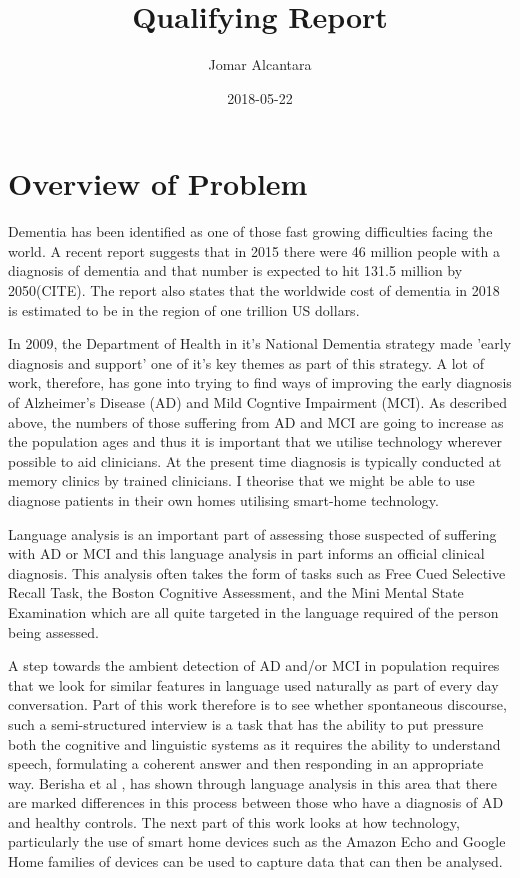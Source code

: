 \documentclass{article}
\title{Qualifying Report}
\date{2018-05-22}
\author{Jomar Alcantara}
\begin{document}
	\maketitle
	\newpage
	\section{Overview of Problem}
	Dementia has been identified as one of those fast growing difficulties facing the world. A recent report suggests that in 2015 there were 46 million people with a diagnosis of dementia and that number is expected to hit 131.5 million by 2050(CITE). The report also states that the worldwide cost of dementia in 2018 is estimated to be in the region of one trillion US dollars.
	\newline
	\par
	In 2009, the Department of Health in it's National Dementia strategy made 'early diagnosis and support' one of it's key themes as part of this strategy. A lot of work, therefore, has gone into trying to find ways of improving the early diagnosis of Alzheimer's Disease (AD) and Mild Cogntive Impairment (MCI). As described above, the numbers of those suffering from AD and MCI are going to increase as the population ages and thus it is important that we utilise technology wherever possible to aid clinicians. At the present time diagnosis is typically conducted at memory clinics by trained clinicians. I theorise that we might be able to use diagnose patients in their own homes utilising smart-home technology. 
	\newline
	\par
	Language analysis is an important part of assessing those suspected of suffering with AD or MCI and this language analysis in part informs an official clinical diagnosis. This analysis often takes the form of tasks such as Free Cued Selective Recall Task, the Boston Cognitive Assessment, and the Mini Mental State Examination which are all quite targeted in the language required of the person being assessed. 
	\newline
	\par
	A step towards the ambient detection of AD and/or MCI in population requires that we look for similar features in language used naturally as part of every day conversation. Part of this work therefore is to see whether spontaneous discourse, such a semi-structured interview is a task that has the ability to put pressure both the cognitive and linguistic systems as it requires the ability to understand speech, formulating a coherent answer and then responding in an appropriate way. Berisha et al \cite{Berisha2015}, has shown through language analysis in this area that there are marked differences in this process between those who have a diagnosis of AD and healthy controls. The next part of this work looks at how technology, particularly the use of smart home devices such as the Amazon Echo and Google Home families of devices can be used to capture data that can then be analysed.
\end{document}
